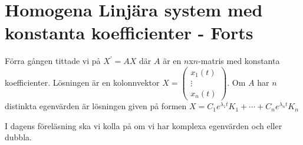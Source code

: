 \section{Homogena Linjära system med konstanta koefficienter - Forts}
\par\bigskip
\noindent Förra gången tittade vi på $X^{\prime} = AX$ där $A$ är en $n$x$n$-matris med konstanta koefficienter. Lösningen är en kolonnvektor $X = \begin{pmatrix}x_1(t)\\\vdots\\x_n(t)\end{pmatrix}$. Om $A$ har $n$ distinkta egenvärden är lösningen given på formen $X = C_1e^{\lambda_1t}K_1 + \cdots + C_ne^{\lambda_nt}K_n$
\par\bigskip
\noindent I dagens föreläsning ska vi kolla på om vi har komplexa egenvärden och eller dubbla.
\par\bigskip
